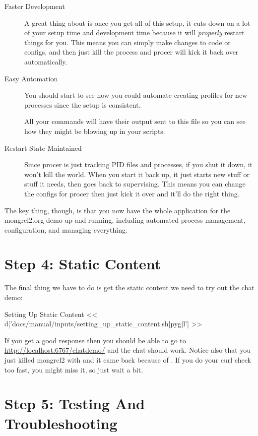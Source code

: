 \begin{description}
\item [Faster Development]  A great thing about  is once you get all of this setup,
    it cuts down on a lot of your setup time and development time because
    it will \emph{properly} restart things for you.  This means you can
    simply make changes to code or configs, and then just kill the process and
    procer will kick it back over automatically.
\item [Easy Automation]  You should start to see how you could automate creating
    profiles for new processes since the setup is consistent.
  \item []  All your commands will have their output sent to
    this file so you can see how they might be blowing up in your scripts.
\item [Restart State Maintained]  Since procer is just tracking PID files and
    processes, if you shut it down, it won't kill the world.  When you start
    it back up, it just starts new stuff or stuff it needs, then goes back to
    supervising.  This means you can change the configs for procer then just
    kick it over and it'll do the right thing.
\end{description}

The key thing, though, is that you now have the whole application for
the mongrel2.org demo up and running, including automated process management,
configuration, and managing everything.

\section{Step 4: Static Content}

The final thing we have to do is get the static content we need to try
out the chat demo:

\begin{code}{Setting Up Static Content}
<< d['docs/manual/inputs/setting_up_static_content.sh|pyg|l'] >>
\end{code}

If you get a good response then you should be able to go to
\url{http://localhost:6767/chatdemo/} and the chat should work.  Notice
also that you just killed mongrel2 with  and it came back
because of .  If you do your curl check too fast,
you might miss it, so just wait a bit.

\section{Step 5: Testing And Troubleshooting}

